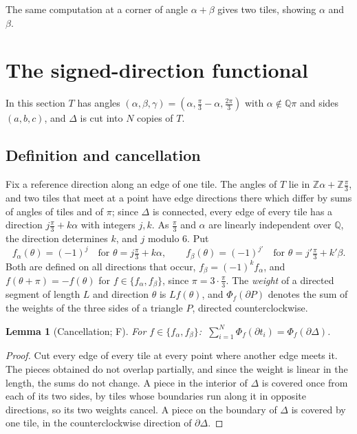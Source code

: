 \documentclass[11pt,reqno]{amsart}
\theoremstyle{plain}
\newtheorem{lemma}[theorem]{Lemma}
\theoremstyle{definition}
\newcommand{\Z}{\mathbb{Z}}
\newcommand{\Q}{\mathbb{Q}}
\newcommand{\sF}{\textup{\textsf{F}}}
\begin{document}
The same computation at a corner of angle $\alpha+\beta$ gives two tiles, showing $\alpha$ and $\beta$.

\section{The signed-direction functional}\label{sec:invariant}

In this section $T$ has angles $(\alpha,\beta,\gamma)=(\alpha,\frac\pi3-\alpha,\frac{2\pi}3)$ with
$\alpha\notin\Q\pi$ and sides $(a,b,c)$, and $\Delta$ is cut into $N$ copies of $T$.

\subsection{Definition and cancellation}
Fix a reference direction along an edge of one tile. The angles of $T$ lie in $\Z\alpha+\Z\frac\pi3$, and
two tiles that meet at a point have edge directions there which differ by sums of angles of tiles and of
$\pi$; since $\Delta$ is connected, every edge of every tile has a direction $j\frac\pi3+k\alpha$ with
integers $j,k$. As $\frac\pi3$ and $\alpha$ are linearly independent over $\Q$, the direction determines
$k$, and $j$ modulo $6$. Put
\[
f_\alpha(\theta)=(-1)^j\quad\text{for }\theta=j\tfrac\pi3+k\alpha,\qquad
f_\beta(\theta)=(-1)^{j'}\quad\text{for }\theta=j'\tfrac\pi3+k'\beta .
\]
Both are defined on all directions that occur, $f_\beta=(-1)^kf_\alpha$, and
$f(\theta+\pi)=-f(\theta)$ for $f\in\{f_\alpha,f_\beta\}$, since $\pi=3\cdot\frac\pi3$. The \emph{weight}
of a directed segment of length $L$ and direction $\theta$ is $Lf(\theta)$, and $\Phi_f(\partial P)$ denotes
the sum of the weights of the three sides of a triangle $P$, directed counterclockwise.

\begin{lemma}[Cancellation; \sF]\label{lem:cancel}
For $f\in\{f_\alpha,f_\beta\}$: $\ \sum_{i=1}^N\Phi_f(\partial t_i)=\Phi_f(\partial\Delta)$.
\end{lemma}

\begin{proof}
Cut every edge of every tile at every point where another edge meets it. The pieces obtained do not overlap
partially, and since the weight is linear in the length, the sums do not change. A piece in the interior of
$\Delta$ is covered once from each of its two sides, by tiles whose boundaries run along it in opposite
directions, so its two weights cancel. A piece on the boundary of $\Delta$ is covered by one tile, in the
counterclockwise direction of $\partial\Delta$.
\end{proof}
\end{document}
